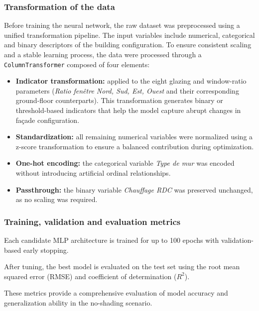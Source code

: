 \documentclass{article}
\begin{document}
\subsubsection{Transformation of the data}
Before training the neural network, the raw dataset was preprocessed using 
a unified transformation pipeline. The input variables include numerical, 
categorical and binary descriptors of the building configuration. To ensure 
consistent scaling and a stable learning process, the data were processed 
through a \texttt{ColumnTransformer} composed of four elements:
\begin{itemize}
    \item \textbf{Indicator transformation:} applied to the eight glazing and 
    window-ratio parameters (\textit{Ratio fenêtre Nord, Sud, Est, Ouest} and 
    their corresponding \\ground-floor counterparts). This transformation 
    generates binary or threshold-based indicators that help the model capture 
    abrupt changes in façade configuration.

    \item \textbf{Standardization:} all remaining numerical variables were 
    normalized using a z-score transformation to ensure a balanced contribution 
    during optimization.

    \item \textbf{One-hot encoding:} the categorical variable 
    \textit{Type de mur} was encoded without introducing artificial ordinal 
    relationships.

    \item \textbf{Passthrough:} the binary variable \textit{Chauffage RDC} was 
    preserved unchanged, as no scaling was required.
\end{itemize}


\subsubsection{Training, validation and evaluation metrics}

Each candidate MLP architecture is trained for up to 100 epochs with 
validation-based early stopping. 

After tuning, the best model is evaluated on the test set using the root 
mean squared error (RMSE) and coefficient of determination ($R^2$).

These metrics provide a comprehensive evaluation of model accuracy and 
generalization ability in the no-shading scenario.
\end{document}
